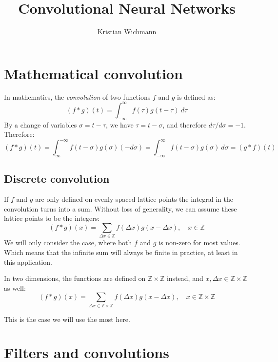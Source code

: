 \documentclass[12pt, a4paper]{article}
\title{Convolutional Neural Networks}
\author{Kristian Wichmann}
\numberwithin{equation}{section}
\begin{document}
\maketitle

\section{Mathematical convolution}
In mathematics, the \textit{convolution} of two functions $f$ and $g$ is defined as:
\begin{equation}
(f*g)(t)=\int_{-\infty}^\infty f(\tau)g(t-\tau)\ d\tau
\end{equation}
By a change of variables $\sigma=t-\tau$, we have $\tau=t-\sigma$, and therefore $d\tau/d\sigma=-1$. Therefore:
\begin{equation}
(f*g)(t)=\int_\infty^{-\infty}f(t-\sigma)g(\sigma)(-d\sigma)=\int_{-\infty}^\infty f(t-\sigma)g(\sigma)\ d\sigma=(g*f)(t)
\end{equation}

\subsection{Discrete convolution}
If $f$ and $g$ are only defined on evenly spaced lattice points the integral in the convolution turns into a sum. Without loss of generality, we can assume these lattice points to be the integers:
\begin{equation}
(f*g)(x)=\sum_{\Delta x\in\mathbb{Z}}f(\Delta x)g(x-\Delta x),\quad x\in\mathbb{Z}
\end{equation}
We will only consider the case, where both $f$ and $g$ is non-zero for most values. Which means that the infinite sum will always be finite in practice, at least in this application.

In two dimensions, the functions are defined on $\mathbb{Z}\times\mathbb{Z}$ instead, and $x,\Delta x\in\mathbb{Z}\times\mathbb{Z}$ as well:
\begin{equation}
(f*g)(x)=\sum_{\Delta x\in\mathbb{Z}\times\mathbb{Z}}f(\Delta x)g(x-\Delta x),\quad x\in\mathbb{Z}\times\mathbb{Z}
\label{2d_convolution}
\end{equation}

This is the case we will use the most here.

\section{Filters and convolutions}
\end{document}
